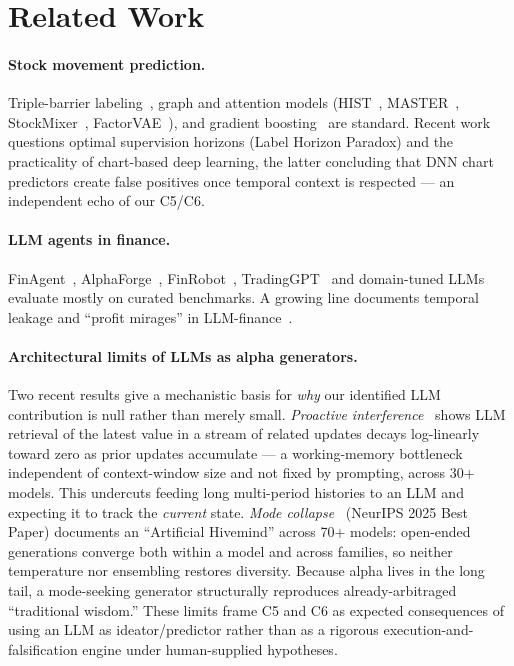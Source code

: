 \documentclass[sigconf,nonacm]{acmart}
\begin{document}
\section{Related Work}\label{sec:related}

\paragraph{Stock movement prediction.} Triple-barrier labeling~\cite{lopezdeprado2018advances},
graph and attention models (HIST~\cite{xu2021hist}, MASTER~\cite{li2024master},
StockMixer~\cite{fan2024stockmixer}, FactorVAE~\cite{duan2022factorvae}), and gradient
boosting~\cite{ke2017lightgbm,friedman2001greedy} are standard. Recent work questions
optimal supervision horizons (Label Horizon Paradox) and the practicality of chart-based
deep learning, the latter concluding that DNN chart predictors create false positives
once temporal context is respected --- an independent echo of our C5/C6.

\paragraph{LLM agents in finance.} FinAgent~\cite{yu2024finagent},
AlphaForge~\cite{hu2024alphaforge}, FinRobot~\cite{wang2024finrobot},
TradingGPT~\cite{li2024tradinggpt} and domain-tuned LLMs evaluate mostly on curated
benchmarks. A growing line documents temporal leakage and ``profit mirages'' in
LLM-finance~\cite{glasserman2023lookahead,sarkar2024lookahead,lopezlira2023chatgpt,profitmirage2025,ktdfin2026}.

\paragraph{Architectural limits of LLMs as alpha generators.} Two recent results give
a mechanistic basis for \emph{why} our identified LLM contribution is null rather than
merely small. \emph{Proactive interference}~\cite{wang2025proactive} shows LLM retrieval
of the latest value in a stream of related updates decays log-linearly toward zero as
prior updates accumulate --- a working-memory bottleneck independent of context-window
size and not fixed by prompting, across 30+ models. This undercuts feeding long
multi-period histories to an LLM and expecting it to track the \emph{current} state.
\emph{Mode collapse}~\cite{jiang2025hivemind} (NeurIPS 2025 Best Paper) documents an
``Artificial Hivemind'' across 70+ models: open-ended generations converge both within a
model and across families, so neither temperature nor ensembling restores diversity.
Because alpha lives in the long tail, a mode-seeking generator structurally reproduces
already-arbitraged ``traditional wisdom.'' These limits frame C5 and C6 as expected
consequences of using an LLM as ideator/predictor rather than as a rigorous
execution-and-falsification engine under human-supplied hypotheses.
\end{document}
